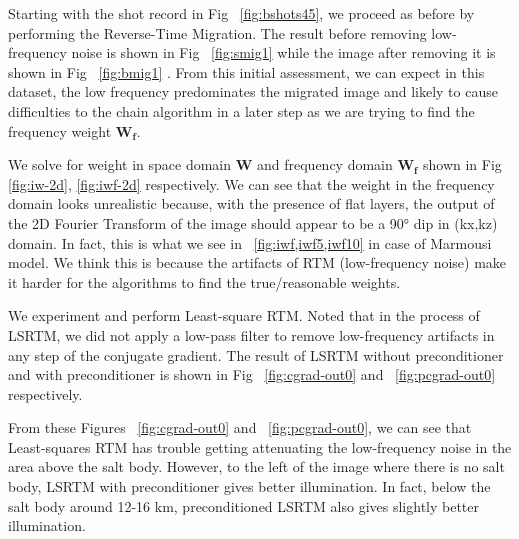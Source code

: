 


Starting with the shot record in Fig ~\ref{fig:bshots45}, we proceed as before by performing the Reverse-Time Migration. The result before removing low-frequency noise is shown in Fig ~\ref{fig:smig1} while the image after removing it is shown in Fig ~\ref{fig:bmig1} . From this initial assessment, we can expect in this dataset, the low frequency predominates the migrated image and likely to cause difficulties to the chain algorithm in a later step as we are trying to find the frequency weight $\mathbf{W_f}$. 



We solve for weight in space domain $\mathbf{W}$ and frequency domain $\mathbf{W_f}$ shown in Fig \ref{fig:iw-2d}, \ref{fig:iwf-2d} respectively. We can see that the weight in the frequency domain looks unrealistic because, with the presence of flat layers, the output of the 2D Fourier Transform of the image should appear to be a 90° dip in (kx,kz) domain. In fact, this is what we see in ~\ref{fig:iwf,iwf5,iwf10} in case of Marmousi model. We think this is because the artifacts of RTM (low-frequency noise) make it harder for the algorithms to find the true/reasonable weights.



We experiment and perform Least-square RTM. Noted that in the process of LSRTM, we did not apply a low-pass filter to remove low-frequency artifacts in any step of the conjugate gradient. The result of LSRTM without preconditioner and with preconditioner is shown in Fig ~\ref{fig:cgrad-out0} and ~\ref{fig:pcgrad-out0} respectively.


From these Figures ~\ref{fig:cgrad-out0} and ~\ref{fig:pcgrad-out0}, we can see that Least-squares RTM has trouble getting attenuating the low-frequency noise in the area above the salt body. However, to the left of the image where there is no salt body, LSRTM with preconditioner gives better illumination. In fact, below the salt body around 12-16 km, preconditioned LSRTM also gives slightly better illumination. 

